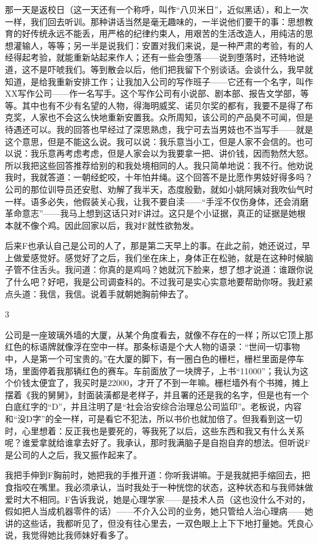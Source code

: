 那一天是返校日（这一天还有一个称呼，叫作“八贝米日”，近似黑话），和上一次一样，我们回去听训。那种讲话当然是毫无趣味的，一半说他们要干的事：思想教育的好传统永远不能丢，用严格的纪律约束人，用艰苦的生活改造人，用纯洁的思想灌输人，等等；另一半是说我们：安置对我们来说，是一种严肃的考验，有的人经得起考验，就能重新站起来作人；还有一些会堕落——说到堕落时，还特地说道，这不是吓唬我们。等到散会以后，他们把我留下个别谈话。会谈什么，我早就知道，是给我重新安排工作；让我加入公司的写作班子——它还有一个名字，叫作XX写作公司——作一名写手。这个写作公司有小说部、剧本部、报告文学部，等等。其中也有不少有名望的人物，得海明威奖、诺贝尔奖的都有，我要不是得了布克奖，人家也不会这么快地重新安置我。众所周知，该公司的产品臭不可闻，但是待遇还可以。我的回答也早经过了深思熟虑，我宁可去当男妓也不当写手——就是这个意思，但是不能这么说。我可以说：我乐意当小工，但是人家不会信的。也可以说：我乐意再考虑考虑，但是人家会以为我要拿一把、讲价钱，因而勃然大怒。所以我把这些回答推荐给别的和我处境相同的人。我只简单地说：我不行。他劝说我时，我就答道：一朝经蛇咬，十年怕井绳。这个回答不是比愿作男妓好得多吗？公司的那位训导员还安慰、劝解了我半天，态度殷勤，就如小姚阿姨对我吹仙气时一样。语多必失，他假装关心我，让我不要自渎——“手淫不仅伤身体，还会消磨革命意志”——我马上想到这话只对F讲过。这只是个小证据，真正的证据是她根本就不像个鸡。因此回家以后，我对F就性欲勃发。 

后来F也承认自己是公司的人了，那是第二天早上的事。在此之前，她还说过，早上做爱感觉好。感觉好了之后，我们坐在床上，身体正在松驰，就是在这种时候脑子管不住舌头。我问道：你真的是鸡吗？她就沉下脸来，想了想才说道：谁跟你说了什么吧？好吧，我是公司调查科的。不过我可是实心实意地要帮助你呀。我赶紧点头道：我信，我信。说着手就朝她胸前伸去了。 

3 

公司是一座玻璃外墙的大厦，从某个角度看去，就像不存在的一样；所以它顶上那红色的标语牌就像浮在空中一样。那条标语是个大人物的语录：“世间一切事物中，人是第一个可宝贵的。”在大厦的脚下，有一圈白色的栅栏，栅栏里面是停车场，里面停着我那辆红色的赛车。车前面放了一块牌子，上书“11000”；我认为这个价钱太便宜了，我买时是22000，才开了不到一年嘛。栅栏墙外有个书摊，摊上摆着《我的舅舅》，封面装潢都是老样子，并且署的还是我的名字，但是也有一个白底红字的“D”，并且注明了是“社会治安综合治理总公司监印”。老板说，内容和“没D字”的全一样，可是看它不犯法，所以书价也就加倍了。但我看到这一切时，心里想着：反正我也是要死的，等我死了以后，这些东西和我又有什么关系呢？谁爱拿就给谁拿去好了。我承认，那时我满脑子是自抱自弃的想法。但听说F是公司的人之后，我又振作起来了。 

我把手伸到F胸前时，她把我的手推开道：你听我讲嘛。于是我就把手缩回去，把食指咬在嘴里。我必须承认，当时我处于一种恍惚的状态，这种状态和与我师妹做爱时大不相同。F告诉我说，她是心理学家——是技术人员（这也没什么不对的，假如把人当成机器零件的话）——不介入公司的业务，她只管给人治心理病——她讲的这些话，我都听见了，但没有往心里去，一双色眼上上下下地打量她。凭良心说，我觉得她比我师妹好看多了。 

